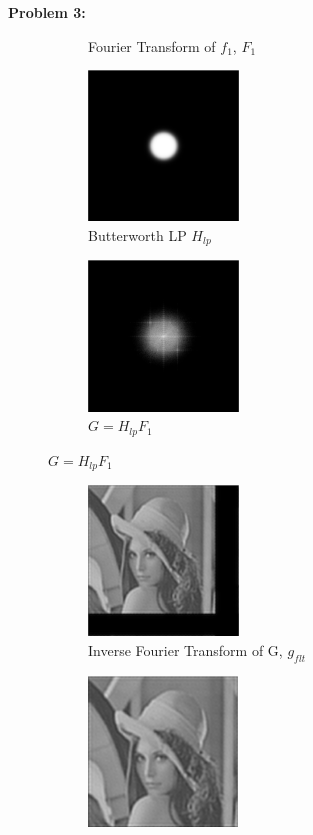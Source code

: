 \documentclass[11pt]{article}
\newenvironment{problem}[1]{\textbf{Problem #1: }}{\newpage}
\begin{document}
\begin{problem}{3}
\begin{enumerate}[label = (\alph*)]
\begin{figure}[h!]
\begin{subfigure}[h!]{.3\textwidth}
					\caption{Fourier Transform of $f_1$, $F_1$}
				\end{subfigure}
				\begin{subfigure}[h!]{.3\textwidth}
					\centering
					\includegraphics[height = 4cm]{Figures/Prob3/5}
					\caption{Butterworth LP $H_{lp}$}
				\end{subfigure}
				\begin{subfigure}[h!]{.3\textwidth}
					\centering
					\includegraphics[height = 4cm]{Figures/Prob3/6}
					\caption{$G = H_{lp}F_1$}
				\end{subfigure}
			\end{figure}
			\begin{figure}[h!]
				\centering
				\begin{subfigure}[h!]{.4\textwidth}
					\centering
					\includegraphics[height = 4cm]{Figures/Prob3/7}
					\caption{Inverse Fourier Transform of G, $g_{flt}$}
				\end{subfigure}
				\begin{subfigure}[h!]{.4\textwidth}
					\centering
					\includegraphics[height = 4cm]{Figures/Prob3/8}

\end{subfigure}
\end{figure}
\end{enumerate}
\end{problem}
\end{document}
